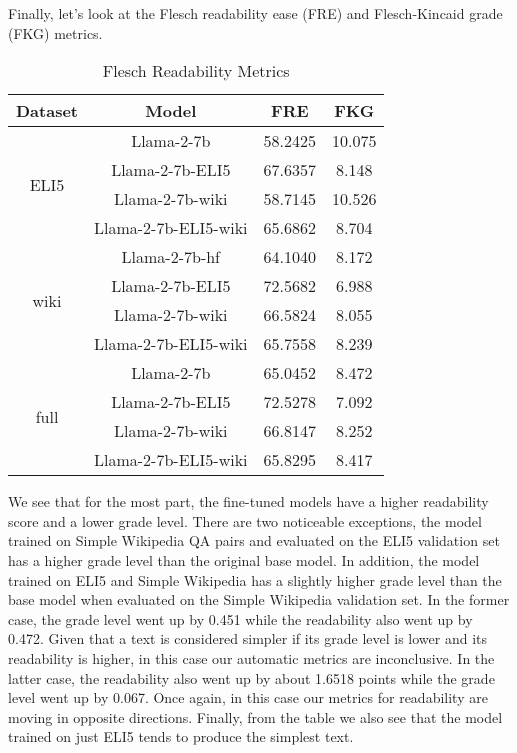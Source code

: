 \documentclass[11pt, oneside]{article}   	%
\begin{document}
Finally, let's look at the Flesch readability ease (FRE) and Flesch-Kincaid grade (FKG) metrics. 
\begin{table}[h]
\centering
\begin{tabular}{|c|c|c|c|}
\hline
\textbf{Dataset} & \textbf{Model} & \textbf{FRE} & \textbf{FKG} \\
\hline
\multirow{4}{*}{ELI5} & Llama-2-7b & 58.2425 & 10.075 \\
& Llama-2-7b-ELI5 & 67.6357 & 8.148  \\
& Llama-2-7b-wiki & 58.7145 & 10.526 \\
& Llama-2-7b-ELI5-wiki & 65.6862 &8.704  \\
\hline
\multirow{4}{*}{wiki} & Llama-2-7b-hf & 64.1040 & 8.172\\
& Llama-2-7b-ELI5 & 72.5682&6.988 \\
& Llama-2-7b-wiki & 66.5824 &8.055\\
& Llama-2-7b-ELI5-wiki & 65.7558 &8.239\\
\hline
\multirow{4}{*}{full} & Llama-2-7b & 65.0452&8.472 \\
& Llama-2-7b-ELI5 & 72.5278&7.092 \\
& Llama-2-7b-wiki & 66.8147&8.252 \\
& Llama-2-7b-ELI5-wiki & 65.8295 &8.417\\
\hline
\end{tabular}
\caption{Flesch Readability Metrics}
\end{table}
We see that for the most part, the fine-tuned models have a higher readability score and a lower grade level.
There are two noticeable exceptions, the model trained on Simple Wikipedia QA pairs and evaluated on the ELI5 validation set has a higher grade level than the original base model.
In addition, the model trained on ELI5 and Simple Wikipedia has a slightly higher grade level than the base model when evaluated on the Simple Wikipedia validation set. 
In the former case, the grade level went up by 0.451 while the readability also went up by 0.472.
Given that a text is considered simpler if its grade level is lower and its readability is higher, in this case our automatic metrics are inconclusive.
In the latter case, the readability also went up by about 1.6518 points while the grade level went up by 0.067.
Once again, in this case our metrics for readability are moving in opposite directions. 
Finally, from the table we also see that the model trained on just ELI5 tends to produce the simplest text. 
\end{document}
